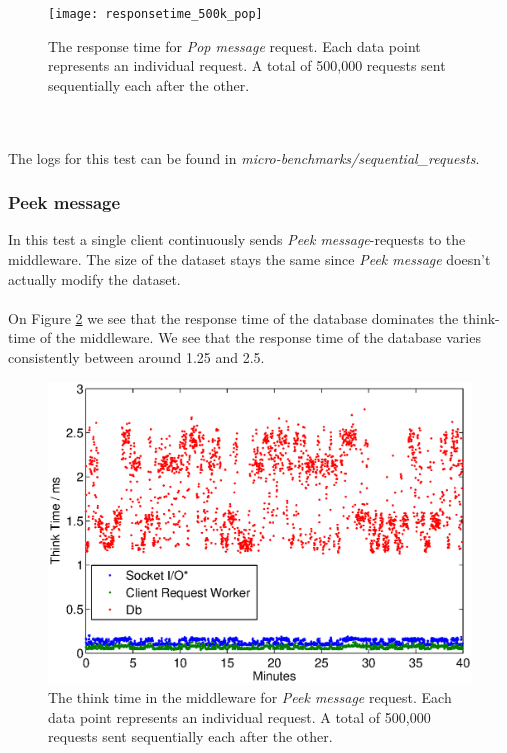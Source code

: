 \documentclass{article}
\begin{document}
                \begin{figure}[H]
                    \centering
                    \centerline{\texttt{[image: responsetime\_500k\_pop]}}
                    \caption{The response time for \textit{Pop message} request. Each data point represents an individual request. A total of 500,000 requests sent sequentially each after the other.}
                    \label{fig:responsetime_500k_pop}
                \end{figure}                
                ~\\
                \\           
                
        The logs for this test can be found in \textit{micro-benchmarks/sequential\_requests}.
            \subsubsection{Peek message}
                In this test a single client continuously sends \textit{Peek message}-requests to the middleware. The size of the dataset stays the same since \textit{Peek message} doesn't actually modify the dataset.\\
                \\
                On Figure \ref{fig:thinktime_500k_peek} we see that the response time of the database dominates the think-time of the middleware. We see that the response time of the database varies consistently between around 1.25 and 2.5.

                \begin{figure}[H]
                    \centering
                    \centerline{\includegraphics[scale=0.50]{thinktime_500k_peek}}
                    \caption{The think time in the middleware for \textit{Peek message} request. Each data point represents an individual request. A total of 500,000 requests sent sequentially each after the other.}
                    \label{fig:thinktime_500k_peek}
                \end{figure}
\end{document}
